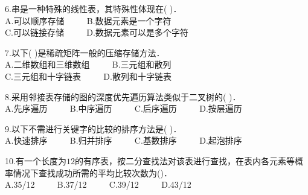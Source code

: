 6.串是一种特殊的线性表，其特殊性体现在( )． \\
A.可以顺序存储 $\qquad$ B.数据元素是一个字符 \\
C.可以链接存储 $\qquad$ D.数据元素可以是多个字符

7.以下( )是稀疏矩阵一般的压缩存储方法． \\
A.二维数组和三维数组 $\qquad$ B.三元组和散列 \\
C.三元组和十字链表 $\qquad$ D.散列和十字链表

8.采用邻接表存储的图的深度优先遍历算法类似于二叉树的( )． \\
A.先序遍历 $\qquad$ B.中序遍历 $\qquad$ C.后序遍历 $\qquad$ D.按层遍历

9.以下不需进行关键字的比较的排序方法是(  )． \\
A.快速排序 $\qquad$ B.归并排序 $\qquad$ C.基数排序 $\qquad$ D.起泡排序

10.有一个长度为$12$的有序表，按二分查找法对该表进行查找，在表内各元素等概率情况下查找成功所需的平均比较次数为()． \\
A.35/12 $\qquad$ B.37/12 $\qquad$ C.39/12 $\qquad$ D.43/12

